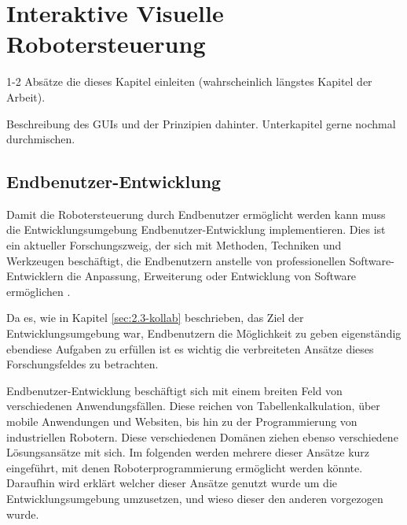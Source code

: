 \chapter{Interaktive Visuelle Robotersteuerung}\label{ch:interak-vis-roboterst} %
1-2 Absätze die dieses Kapitel einleiten (wahrscheinlich längstes Kapitel der Arbeit).

Beschreibung des GUIs und der Prinzipien dahinter. Unterkapitel gerne nochmal durchmischen.

\section{Endbenutzer-Entwicklung} %
Damit die Robotersteuerung durch Endbenutzer ermöglicht werden kann muss die Entwicklungsumgebung Endbenutzer-Entwicklung implementieren. Dies ist ein aktueller Forschungszweig, der sich mit Methoden, Techniken und Werkzeugen beschäftigt, die Endbenutzern anstelle von professionellen Software-Entwicklern die Anpassung, Erweiterung oder Entwicklung von Software ermöglichen \cite{Lieberman2006EUDaEP}.

Da es, wie in Kapitel \ref{sec:2.3-kollab} beschrieben, das Ziel der Entwicklungsumgebung war, Endbenutzern die Möglichkeit zu geben eigenständig ebendiese Aufgaben zu erfüllen ist es wichtig die verbreiteten Ansätze dieses Forschungsfeldes zu betrachten.

Endbenutzer-Entwicklung beschäftigt sich mit einem breiten Feld von verschiedenen Anwendungsfällen. Diese reichen von Tabellenkalkulation, über mobile Anwendungen und Websiten, bis hin zu der Programmierung von industriellen Robotern. Diese verschiedenen Domänen ziehen ebenso verschiedene Lösungsansätze mit sich. Im folgenden werden mehrere dieser Ansätze kurz eingeführt, mit denen Roboterprogrammierung ermöglicht werden könnte. Daraufhin wird erklärt welcher dieser Ansätze genutzt wurde um die Entwicklungsumgebung umzusetzen, und wieso dieser den anderen vorgezogen wurde. %

